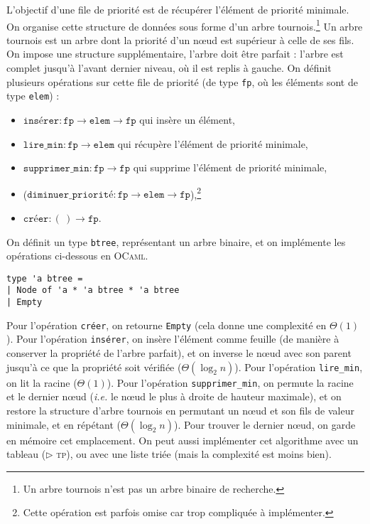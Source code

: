 \documentclass[a4paper]{article}
\begin{document}
	L'objectif d'une file de priorité est de récupérer l'élément de priorité minimale.
	On organise cette structure de données sous forme d'un arbre tournois.\footnote{Un arbre tournois n'est pas un arbre binaire de recherche.}
	Un arbre tournois est un arbre dont la priorité d'un nœud est supérieur à celle de ses fils.
	On impose une structure supplémentaire, l'arbre doit être parfait : l'arbre est complet jusqu'à l'avant dernier niveau, où il est replis à gauche.
	 On définit plusieurs opérations sur cette file de priorité (de type \texttt{fp}, où les éléments sont de type \texttt{elem}) :
	\begin{itemize}
		\item $\texttt{insérer} : \texttt{fp} \to \texttt{elem} \to \texttt{fp}$ qui insère un élément,
		\item $\texttt{lire\_min} : \texttt{fp} \to \texttt{elem}$ qui récupère l'élément de priorité minimale,
		\item $\texttt{supprimer\_min} : \texttt{fp} \to \texttt{fp}$ qui supprime l'élément de priorité minimale,
		\item ($\texttt{diminuer\_priorité} : \texttt{fp} \to \texttt{elem} \to \texttt{fp}$),\footnote{Cette opération est parfois omise car trop compliquée à implémenter.}
		\item $\texttt{créer} : (\:) \to \texttt{fp}$.
	\end{itemize}
	On définit un type \texttt{btree}, représentant un arbre binaire, et on implémente les opérations ci-dessous en \textsc{OCaml}.
	\begin{lstlisting}[language=caml,caption=Définition du type \texttt{btree}]
type 'a btree =
| Node of 'a * 'a btree * 'a btree
| Empty
	\end{lstlisting}
	Pour l'opération \texttt{créer}, on retourne \texttt{Empty} (cela donne une complexité en $\Theta(1)$). 
	Pour l'opération \texttt{insérer}, on insère l'élément comme feuille (de manière à conserver la propriété de l'arbre parfait), et on inverse le nœud avec son parent jusqu'à ce que la propriété soit vérifiée ($\Theta(\log_2 n)$).
	Pour l'opération \texttt{lire\_min}, on lit la racine ($\Theta(1)$).
	Pour l'opération \texttt{supprimer\_min}, on permute la racine et le dernier nœud (\textit{i.e.} le nœud le plus à droite de hauteur maximale), et on restore la structure d'arbre tournois en permutant un nœud et son fils de valeur minimale, et en répétant ($\Theta(\log_2 n)$).
	Pour trouver le dernier nœud, on garde en mémoire cet emplacement.
	On peut aussi implémenter cet algorithme avec un tableau ($\triangleright$ \textsc{tp}), ou avec une liste triée (mais la complexité est moins bien).
\end{document}
